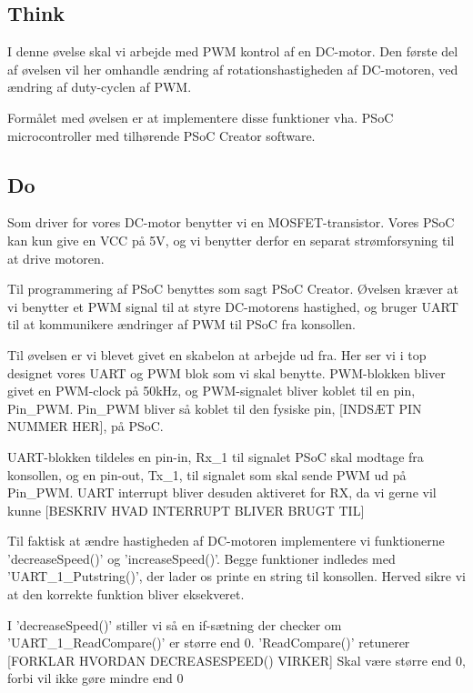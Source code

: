 \documentclass[../main.tex]{subfiles}
\begin{document}
\subsection{Think}
I denne øvelse skal vi arbejde med PWM kontrol af en DC-motor. Den første del af øvelsen vil her omhandle ændring af rotationshastigheden af DC-motoren, ved ændring af duty-cyclen af PWM.

Formålet med øvelsen er at implementere disse funktioner vha. PSoC microcontroller med tilhørende PSoC Creator software. 

\subsection{Do}
Som driver for vores DC-motor benytter vi en MOSFET-transistor. Vores PSoC kan kun give en VCC på 5V, og vi benytter derfor en separat strømforsyning til at drive motoren.

Til programmering af PSoC benyttes som sagt PSoC Creator. Øvelsen kræver at vi benytter et PWM signal til at styre DC-motorens hastighed, og bruger UART til at kommunikere ændringer af PWM til PSoC fra konsollen.

Til øvelsen er vi blevet givet en skabelon at arbejde ud fra. Her ser vi i top designet vores UART og PWM blok som vi skal benytte. PWM-blokken bliver givet en PWM-clock på 50kHz, og PWM-signalet bliver koblet til en pin, Pin\_PWM. Pin\_PWM bliver så koblet til den fysiske pin, [INDSÆT PIN NUMMER HER], på PSoC.

UART-blokken tildeles en pin-in, Rx\_1 til signalet PSoC skal modtage fra konsollen, og en pin-out, Tx\_1, til signalet som skal sende PWM ud på Pin\_PWM. UART interrupt bliver desuden aktiveret for RX, da vi gerne vil kunne [BESKRIV HVAD INTERRUPT BLIVER BRUGT TIL]

Til faktisk at ændre hastigheden af DC-motoren implementere vi funktionerne ’decreaseSpeed()’ og ’increaseSpeed()’. Begge funktioner indledes med ’UART\_1\_Putstring()’, der lader os printe en string til konsollen. Herved sikre vi at den korrekte funktion bliver eksekveret. 


I ’decreaseSpeed()’ stiller vi så en if-sætning der checker om ’UART\_1\_ReadCompare()’ er større end 0. ’ReadCompare()’ retunerer [FORKLAR HVORDAN DECREASESPEED() VIRKER]
Skal være større end 0, forbi vil ikke gøre mindre end 0
\end{document}
